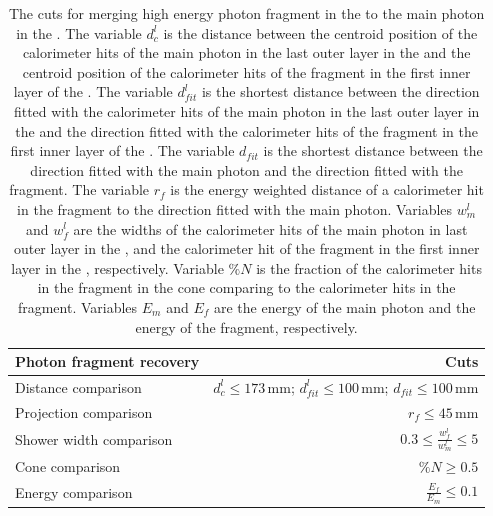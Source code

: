 \begin{table}[htbp]
\centering

\smallskip

\begin{tabular}{l r }
\hline
\hline
Photon fragment recovery&  Cuts\\
\hline
\multicolumn{1}{L{0.3\textwidth}}{Distance comparison} & \multicolumn{1}{R{0.6\textwidth}}{$d^l_c \leqslant 173\,\text{mm}$; $d^l_{fit} \leqslant 100\,\text{mm}$; $d_{fit} \leqslant 100\,\text{mm}$} \\
\multicolumn{1}{L{0.3\textwidth}}{Projection comparison} & \multicolumn{1}{R{0.6\textwidth}}{$ r_f \leqslant 45\,\text{mm}$} \\
\multicolumn{1}{L{0.3\textwidth}}{Shower width comparison} & \multicolumn{1}{R{0.6\textwidth}}{$  0.3 \leqslant \frac{w^l_f}{w^l_m} \leqslant 5$} \\
\multicolumn{1}{L{0.3\textwidth}}{Cone comparison} & \multicolumn{1}{R{0.6\textwidth}}{$ \%{N} \geqslant 0.5$} \\
\multicolumn{1}{L{0.3\textwidth}}{Energy comparison} & \multicolumn{1}{R{0.6\textwidth}}{$ \frac{E_f}{E_m} \leqslant 0.1$} \\
\hline
\hline
\end{tabular}

\caption[Cuts for merging high energy photon fragment in the \HCAL.]%
{The cuts for merging high energy photon fragment in the \HCAL to the main photon in the \ECAL. The variable $d^l_c$ is the distance between the centroid position of the calorimeter hits of the main photon in the last outer layer in the \ECAL and the centroid position of the calorimeter hits of the fragment in the first inner layer of the \HCAL. The variable $d^l_{fit}$ is the shortest distance between the direction fitted with the calorimeter hits of the main photon in the  last outer layer in the \ECAL and the direction fitted with  the calorimeter hits of the fragment in the first inner layer of the \HCAL. The variable $d_{fit}$ is the shortest distance between the direction fitted with the main photon and the direction fitted with the fragment. The variable  $r_f$ is the \rms energy weighted distance of a calorimeter hit in the fragment to the direction fitted with the main photon. Variables $w^l_m$ and $w^l_f$ are the \rms widths of the calorimeter hits of the main photon in last outer layer  in the \ECAL, and the calorimeter hit of the fragment in the first inner layer  in the \HCAL, respectively. Variable $\%{N}$ is the fraction of the calorimeter hits in the fragment in the cone comparing to the  calorimeter hits in the fragment.  Variables $E_m$ and $E_f$ are the energy of the main photon  and the energy of the fragment, respectively.}
\label{tab:photonHighEnergyFragCuts}
\end{table}


